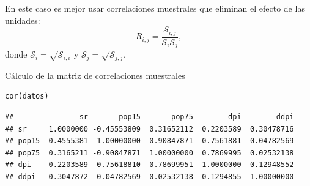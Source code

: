 En este caso es mejor usar correlaciones muestrales que eliminan el efecto de las unidades: \[ R_{i,j}=\dfrac{\mathcal{S}_{i,j}}{\mathcal{S}_i\mathcal{S}_j}, \] donde $\mathcal{S}_i=\sqrt{\mathcal{S}_{i,i}}$ y $\mathcal{S}_j=\sqrt{\mathcal{S}_{j,j}}$.

Cálculo de la matriz de correlaciones muestrales

\begin{lstlisting}
cor(datos)
\end{lstlisting}

\begin{verbatim}
##               sr       pop15       pop75        dpi        ddpi
## sr     1.0000000 -0.45553809  0.31652112  0.2203589  0.30478716
## pop15 -0.4555381  1.00000000 -0.90847871 -0.7561881 -0.04782569
## pop75  0.3165211 -0.90847871  1.00000000  0.7869995  0.02532138
## dpi    0.2203589 -0.75618810  0.78699951  1.0000000 -0.12948552
## ddpi   0.3047872 -0.04782569  0.02532138 -0.1294855  1.00000000
\end{verbatim}

